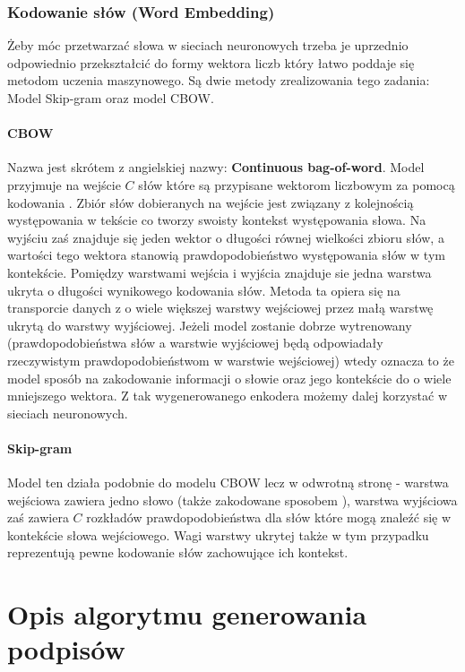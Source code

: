 \subsubsection{Kodowanie słów (Word Embedding)}
Żeby móc przetwarzać słowa w sieciach neuronowych trzeba je uprzednio odpowiednio przekształcić do formy wektora liczb który łatwo poddaje się metodom uczenia maszynowego. Są dwie metody zrealizowania tego zadania: Model Skip-gram oraz model CBOW.
\paragraph{CBOW}
Nazwa jest skrótem z angielskiej nazwy: \textbf{Continuous bag-of-word}.
Model przyjmuje na wejście $C$ słów które są przypisane wektorom liczbowym za pomocą kodowania . Zbiór słów dobieranych na wejście jest związany z kolejnością występowania w tekście co tworzy swoisty kontekst występowania słowa. Na wyjściu zaś znajduje się jeden wektor o długości równej wielkości zbioru słów, a wartości tego wektora stanowią prawdopodobieństwo występowania słów w tym kontekście. Pomiędzy warstwami wejścia i wyjścia znajduje sie jedna warstwa ukryta o długości wynikowego kodowania słów. Metoda ta opiera się na transporcie danych z o wiele większej warstwy wejściowej przez małą warstwę ukrytą do warstwy wyjściowej. Jeżeli model zostanie dobrze wytrenowany (prawdopodobieństwa słów a warstwie wyjściowej będą odpowiadały rzeczywistym prawdopodobieństwom w warstwie wejściowej) wtedy oznacza to że model  sposób na zakodowanie informacji o słowie oraz jego kontekście do o wiele mniejszego wektora. Z tak wygenerowanego enkodera możemy dalej korzystać w sieciach neuronowych. \cite[p.~1,3]{word-embed}
\paragraph{Skip-gram}
Model ten działa podobnie do modelu CBOW lecz w odwrotną stronę - warstwa wejściowa zawiera jedno słowo (także zakodowane sposobem ), warstwa wyjściowa zaś zawiera $C$ rozkładów prawdopodobieństwa dla słów które mogą znaleźć się w kontekście słowa wejściowego. Wagi warstwy ukrytej także w tym przypadku reprezentują pewne kodowanie słów zachowujące ich kontekst.

\section{Opis algorytmu generowania podpisów}

